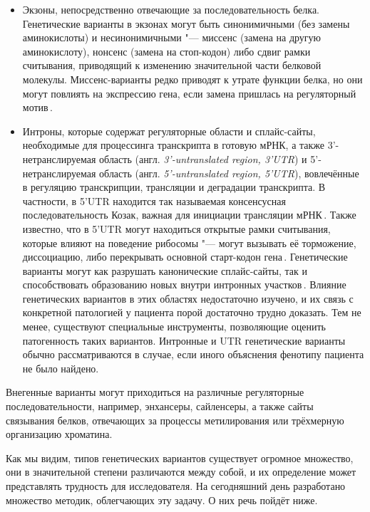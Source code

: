 \documentclass[a4paper,14pt]{extarticle}
\newcommand{\engterm}[1]{англ. \textenglish{\textit{#1}}}
\begin{document}
\begin{itemize}
	\item Экзоны, непосредственно отвечающие за последовательность белка.
	      Генетические варианты в экзонах могут быть синонимичными (без замены аминокислоты) и несинонимичными "--- миссенс (замена на другую аминокислоту), нонсенс (замена на стоп-кодон) либо сдвиг рамки считывания, приводящий к изменению значительной части белковой молекулы.
	      Миссенс-варианты редко приводят к утрате функции белка, но они могут повлиять на экспрессию гена, если замена пришлась на регуляторный мотив\,\citep{j_Brea_Fernandez_2011}.
	\item Интроны, которые содержат регуляторные области и сплайс-сайты, необходимые для процессинга транскрипта в готовую мРНК, а также 3'\hyp{}нетранслируемая область (\engterm{3'\hyp{}untranslated region, 3'UTR}) и 5'\hyp{}нетранслируемая область (\engterm{5'\hyp{}untranslated region, 5'UTR}), вовлечённые в регуляцию транскрипции, трансляции и деградации транскрипта.
	      В частности, в 5'UTR находится так называемая консенсусная последовательность Козак, важная для инициации трансляции мРНК\,\citep{Kozak_1987}.
	      Также известно, что в 5'UTR могут находиться открытые рамки считывания, которые влияют на поведение рибосомы "--- могут вызывать её торможение, диссоциацию, либо перекрывать основной старт-кодон гена\,\citep{Young_2016}.
	      Генетические варианты могут как разрушать канонические сплайс-сайты, так и способствовать образованию новых внутри интронных участков\,\citep{Abramowicz_2018}.
	      Влияние генетических вариантов в этих областях недостаточно изучено, и их связь с конкретной патологией у пациента порой достаточно трудно доказать.
	      Тем не менее, существуют специальные инструменты, позволяющие оценить патогенность таких вариантов.
	      Интронные и UTR генетические варианты обычно рассматриваются в случае, если иного объяснения фенотипу пациента не было найдено.
\end{itemize}

Внегенные варианты могут приходиться на различные регуляторные последовательности, например, энхансеры, сайленсеры, а также сайты связывания белков, отвечающих за процессы метилирования или трёхмерную организацию хроматина.

Как мы видим, типов генетических вариантов существует огромное множество, они в значительной степени различаются между собой, и их определение может представлять трудность для исследователя.
На сегодняшний день разработано множество методик, облегчающих эту задачу.
О них речь пойдёт ниже.
\end{document}
